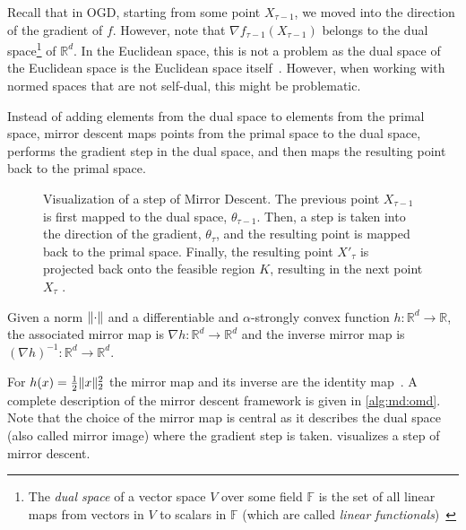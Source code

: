 Recall that in OGD, starting from some point $X_{\tau-1}$, we moved into the direction of the gradient of $f$. However, note that $\nabla f_{\tau-1}(X_{\tau-1})$ belongs to the dual space\footnote{The \emph{dual space} of a vector space $V$ over some field $\mathbb{F}$ is the set of all linear maps from vectors in $V$ to scalars in $\mathbb{F}$ (which are called \emph{linear functionals})~\cite{Wadsley2015}} of $\mathbb{R}^d$. In the Euclidean space, this is not a problem as the dual space of the Euclidean space is the Euclidean space itself~\cite{Gupta2020}. However, when working with normed spaces that are not self-dual, this might be problematic.

Instead of adding elements from the dual space to elements from the primal space, mirror descent maps points from the primal space to the dual space, performs the gradient step in the dual space, and then maps the resulting point back to the primal space.

\begin{figure}
    \centering
    
    \caption{Visualization of a step of Mirror Descent. The previous point $X_{\tau-1}$ is first mapped to the dual space, $\theta_{\tau-1}$. Then, a step is taken into the direction of the gradient, $\theta_{\tau}$, and the resulting point is mapped back to the primal space. Finally, the resulting point $X'_{\tau}$ is projected back onto the feasible region $K$, resulting in the next point $X_{\tau}$ \cite{Gupta2020}.}
    \label{fig:mirror_descent}
\end{figure}

\begin{definition}
\cite{Gupta2020} Given a norm $\lVert\cdot\rVert$ and a differentiable and $\alpha$-strongly convex function $h : \mathbb{R}^d \to \mathbb{R}$, the associated mirror map is $\nabla h : \mathbb{R}^d \to \mathbb{R}^d$ and the inverse mirror map is $(\nabla h)^{-1} : \mathbb{R}^d \to \mathbb{R}^d$.
\end{definition}

For $h(x) = \frac{1}{2} \lVert x\rVert_2^2$ the mirror map and its inverse are the identity map~\cite{Gupta2020}. A complete description of the mirror descent framework is given in \cref{alg:md:omd}. Note that the choice of the mirror map is central as it describes the dual space (also called mirror image) where the gradient step is taken.  visualizes a step of mirror descent.

